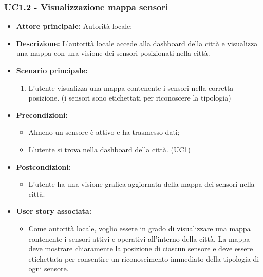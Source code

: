 \subsubsection{UC1.2 - Visualizzazione mappa sensori}
\begin{itemize}
    \item \textbf{Attore principale:} Autorità locale;
    \item \textbf{Descrizione:} L'autorità locale accede alla dashboard della città e visualizza una mappa con una visione dei sensori posizionati nella città.
    \item \textbf{Scenario principale:}
          \begin{enumerate}
              \item L'utente visualizza una mappa contenente i sensori nella corretta posizione. (i sensori sono etichettati per riconoscere la tipologia)
          \end{enumerate}
    \item \textbf{Precondizioni:}
          \begin{itemize}
              \item  Almeno un sensore è attivo e ha trasmesso dati;
              \item L'utente si trova nella dashboard della città. (UC1)
          \end{itemize}
    \item \textbf{Postcondizioni:}
          \begin{itemize}
              \item      L'utente ha una visione grafica aggiornata della mappa dei sensori nella città.
          \end{itemize}
    \item \textbf{User story associata:}
          \begin{itemize}
              \item Come autorità locale, voglio essere in grado di visualizzare una mappa contenente i sensori attivi e operativi all'interno della città. La mappa deve mostrare chiaramente la posizione di ciascun sensore e deve essere etichettata per consentire un riconoscimento immediato della tipologia di ogni sensore.
          \end{itemize}
\end{itemize}
